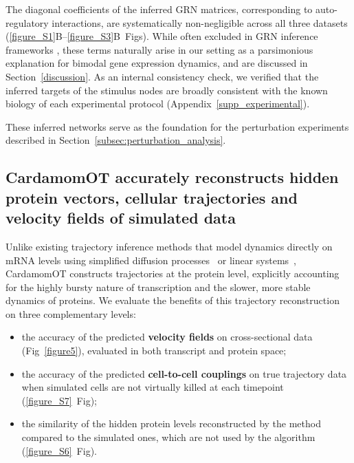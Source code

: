 \documentclass[a4paper, 11pt]{article}
\theoremstyle{plain}
\theoremstyle{remark}
\newcommand*{\firstreview}[1]{{\color{black}#1}}
\begin{document}
The diagonal coefficients of the inferred GRN matrices, corresponding to auto-regulatory
interactions, are systematically non-negligible across all three datasets
(\ref{figure_S1}B--\ref{figure_S3}B~Figs). While often excluded in GRN inference frameworks
\cite{huynh2010inferring}, these terms naturally arise in our setting as a parsimonious
explanation for bimodal gene expression dynamics, and are discussed in
Section~\ref{discussion}. \firstreview{As an internal consistency check, we verified that the
inferred targets of the stimulus nodes are broadly consistent with the known biology of each
experimental protocol (Appendix~\ref{supp_experimental}).}

These inferred networks serve as the foundation for the perturbation experiments described in
Section~\ref{subsec:perturbation_analysis}.

\subsection{CardamomOT accurately reconstructs hidden protein vectors, cellular trajectories and velocity fields \texorpdfstring{\firstreview{of simulated data}}{of simulated data}}
\label{subsec:trajectory_inference_validation}

Unlike existing trajectory inference methods that model dynamics directly on mRNA levels
using simplified diffusion processes~\cite{schiebinger2019optimal} or linear
systems~\cite{zhang2024joint}, CardamomOT constructs trajectories at the protein
level, explicitly accounting for the highly bursty nature of transcription and the slower,
more stable dynamics of proteins. We evaluate the benefits of this trajectory reconstruction on three complementary
levels:
\begin{itemize}
    \item the accuracy of the predicted \textbf{velocity fields} on cross-sectional
data (Fig~\ref{figure5}), evaluated in both transcript and protein space;
    \item the accuracy of the predicted \textbf{cell-to-cell
couplings} on true trajectory data when simulated cells are not virtually killed at each timepoint (\ref{figure_S7}~Fig);
    \item the similarity of the hidden protein levels reconstructed by the method compared to the simulated ones, which are not used by the algorithm (\ref{figure_S6}~Fig).
\end{itemize}
\end{document}
